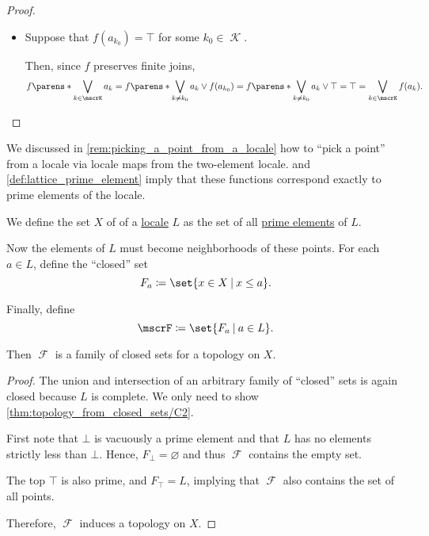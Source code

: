 \begin{proof}
\begin{itemize}
    \item Suppose that \( f(a_{k_0}) = \top \) for some \( k_0 \in \mscrK \).

    Then, since \( f \) preserves finite joins,
    \begin{equation*}
      f\parens*{ \bigvee_{k \in \mscrK} a_k }
      =
      f\parens*{ \bigvee_{k \neq k_0} a_k } \vee f(a_{k_0})
      =
      f\parens*{ \bigvee_{k \neq k_0} a_k } \vee \top
      =
      \top
      =
      \bigvee_{k \in \mscrK} f(a_k).
    \end{equation*}
  \end{itemize}
\end{proof}

\begin{remark}\label{rem:prime_elements_of_locale}
  We discussed in \cref{rem:picking_a_point_from_a_locale} how to \enquote{pick a point} from a locale via locale maps from the two-element locale.  and \cref{def:lattice_prime_element} imply that these functions correspond exactly to prime elements of the locale.
\end{remark}

\begin{proposition}\label{thm:locale_to_topology}
  We define the set \( X \) of  of a \hyperref[def:category_of_small_locales]{locale} \( L \) as the set of all \hyperref[def:lattice_prime_element]{prime elements} of \( L \).

  Now the elements of \( L \) must become neighborhoods of these points. For each \( a \in L \), define the \enquote{closed} set
  \begin{equation*}
    F_a \coloneqq \set{ x \in X \given x \leq a }.
  \end{equation*}

  Finally, define
  \begin{equation*}
    \mscrF \coloneqq \set{ F_a \given a \in L }.
  \end{equation*}

  Then \( \mscrF \) is a family of closed sets for a topology on \( X \).
\end{proposition}
\begin{proof}
  The union and intersection of an arbitrary family of \enquote{closed} sets is again closed because \( L \) is complete. We only need to show \ref{thm:topology_from_closed_sets/C2}.

  First note that \( \bot \) is vacuously a prime element and that \( L \) has no elements strictly less than \( \bot \). Hence, \( F_\bot = \varnothing \) and thus \( \mscrF \) contains the empty set.

  The top \( \top \) is also prime, and \( F_\top = L \), implying that \( \mscrF \) also contains the set of all points.

  Therefore, \( \mscrF \) induces a topology on \( X \).
\end{proof}
